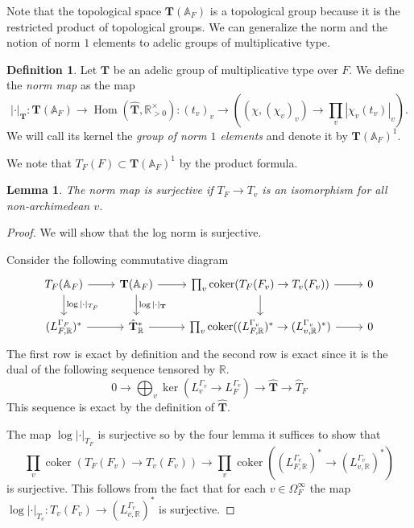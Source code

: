 \documentclass[a4paper,11pt,reqno]{amsart}
\newcommand{\R}{\mathbb{R}}
\newcommand{\A}{\mathbb{A}}
\DeclareMathOperator{\Hom}{Hom}
\DeclareMathOperator{\coker}{coker}
\newtheorem{lemma}[theorem]{Lemma}
\theoremstyle{definition}
\newtheorem{definition}[theorem]{Definition}
\begin{document}
Note that the topological space $\mathbf{T}(\A_F)$ is a topological group because it is the restricted product of topological groups. We can generalize the norm and the notion of norm $1$ elements to adelic groups of multiplicative type.
\begin{definition}
	Let $\mathbf{T}$ be an adelic group of multiplicative type over $F$.
	We define the \emph{norm map} as the map
	\begin{equation*}
		| \cdot |_{\mathbf{T}}: \mathbf{T}(\A_F) \to \Hom(\hat{\mathbf{T}}, \R_{>0}^{\times}): (t_v)_{v} \to \left((\chi, (\chi_v)_v) \to \prod_v |\chi_v(t_v)|_v \right).
	\end{equation*}
	We will call its kernel the \emph{group of norm $1$ elements} and denote it by $\mathbf{T}(\A_F)^1$.
	
	We note that $T_F(F) \subset \mathbf{T}(\A_F)^1$ by the product formula. 
\end{definition}
\begin{lemma}\label{lem:Norm map is surjective}
	The norm map is surjective if $T_F \to T_v$ is an isomorphism for all non-archimedean $v$.
	\label{Norm map is surjective}
\end{lemma}
\begin{proof}
We will show that the log norm is surjective.

Consider the following commutative diagram
\begin{equation}\label{eq:exact sequence of log norm of adelic groups of multiplicative type}
	\begin{tikzcd}
		{T_F(\A_F)} & {\mathbf{T}(\A_F)} & {\prod_v\coker(T_F(F_v) \to T_v(F_v))} & 0 \\
		{(L_{F, \R}^{\Gamma_F})^*} & {\hat{\mathbf{T}}_{\R}^*} & {\prod_v \coker((L_{F, \R}^{\Gamma_v})^* \to (L_{v, \R}^{\Gamma_v})^*)} & 0
		\arrow[from=1-2, to=1-3]
		\arrow[from=1-1, to=1-2]
		\arrow[from=1-3, to=1-4]
		\arrow[from=2-3, to=2-4]
		\arrow[from=2-2, to=2-3]
		\arrow[from=2-1, to=2-2]
		\arrow["{\log |\cdot|_{\mathbf{T}}}", from=1-2, to=2-2]
		\arrow["{\log |\cdot|_{T_F}}", from=1-1, to=2-1]
		\arrow[from=1-3, to=2-3]
	\end{tikzcd}
\end{equation}
The first row is exact by definition and the second row is exact since it is the dual of the following sequence tensored by $\R$. 
\begin{equation*}
	0 \to \bigoplus_v \ker(L_v^{\Gamma_v} \to L_F^{\Gamma_v}) \to \hat{\mathbf{T}} \to \hat{T}_F 
\end{equation*}
This sequence is exact by the definition of $\hat{\mathbf{T}}$.

The map $\log |\cdot|_{T_F}$ is surjective so by the four lemma it suffices to show that 
\[
\prod_v\coker(T_F(F_v) \to T_v(F_v)) \to \prod_v \coker((L_{F, \R}^{\Gamma_v})^* \to (L_{v, \R}^{\Gamma_v})^*)
\] is surjective. This follows from the fact that for each $v \in \Omega_{F}^{\infty}$ the map $\log |\cdot|_{T_v}: T_{v}(F_v) \to (L_{v, \R}^{\Gamma_v})^*$ is surjective.
\end{proof}
\end{document}
